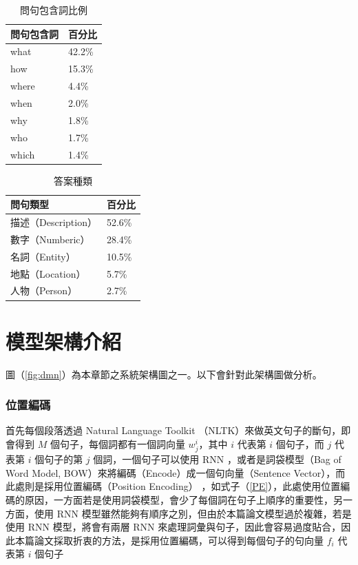 \begin{table}
    \caption{問句包含詞比例}
    \label{table:query_percentage}
    \centering
    \begin{tabular}[h]{|l|l|}
        \hline
        問句包含詞  &百分比\\
        \hline
        what        &42.2\%\\
        \hline
        how         &15.3\%\\
        \hline
        where       &4.4\%\\
        \hline
        when        &2.0\%\\
        \hline
        why         &1.8\%\\
        \hline
        who         &1.7\%\\
        \hline
        which       &1.4\%\\
        \hline
    \end{tabular}
\end{table}
\begin{table}
    \caption{答案種類}
    \label{table:query_type}
    \centering
    \begin{tabular}{|l|l|}
        \hline
        問句類型            &百分比\\
        \hline
        描述（Description） &52.6\%\\
        \hline
        數字（Numberic）    &28.4\%\\
        \hline
        名詞（Entity）      &10.5\%\\
        \hline
        地點（Location）    &5.7\%\\
        \hline
        人物（Person）      &2.7\%\\
        \hline
    \end{tabular}
\end{table}

\section{模型架構介紹}
圖（\ref{fig:dmn}）為本章節之系統架構圖之一。以下會針對此架構圖做分析。

\subsubsection{位置編碼}
首先每個段落透過 Natural Language Toolkit （NLTK）來做英文句子的斷句，即會得到 $M$ 個句子，每個詞都有一個詞向量 $w_j^i$，其中 $i$ 代表第 $i$ 個句子，而 $j$ 代表第 $i$ 個句子的第 $j$ 個詞，一個句子可以使用 RNN ，或者是詞袋模型（Bag of Word Model, BOW）來將編碼（Encode）成一個句向量（Sentence Vector），而此處則是採用位置編碼（Position Encoding）\cite{sukhbaatar2015end}  ，如式子（\ref{PE}），此處使用位置編碼的原因，一方面若是使用詞袋模型，會少了每個詞在句子上順序的重要性，另一方面，使用 RNN 模型雖然能夠有順序之別，但由於本篇論文模型過於複雜，若是使用 RNN 模型，將會有兩層 RNN 來處理詞彙與句子，因此會容易過度貼合，因此本篇論文採取折衷的方法，是採用位置編碼，可以得到每個句子的句向量 $f_i$ 代表第 $i$ 個句子

